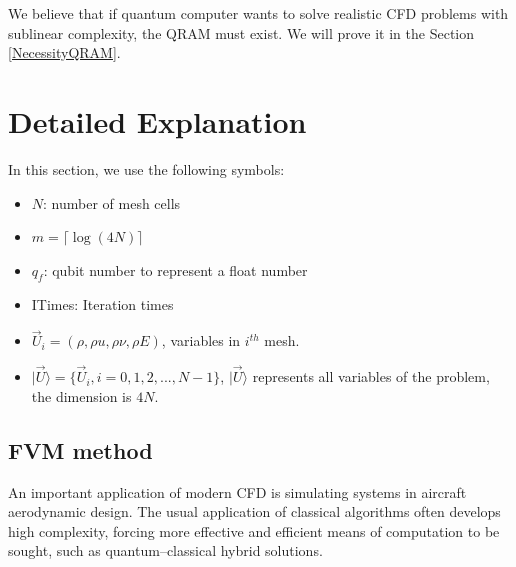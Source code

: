 \documentclass[%
 reprint,
 amsmath,amssymb,
pra,
]{revtex4-1}
\begin{document}
We believe that if quantum computer wants to solve realistic CFD problems with sublinear complexity, the QRAM must exist. We will prove it in the Section \ref{NecessityQRAM}.

\section{Detailed Explanation}\label{detail}
In this section, we use the following symbols:

\begin{itemize}
\item $N$: number of mesh cells
\item $m=\lceil \log(4N) \rceil$
\item $q_f$: qubit number to represent a float number
\item ITimes: Iteration times
\item $\vec{U}_i=(\rho,\rho u, \rho\nu, \rho E)$, variables in $i^{th}$ mesh.
\item $|\vec{U}\rangle=\{\vec{U}_i, i=0,1,2,...,N-1\}$, $|\vec{U}\rangle$ represents all variables of the problem, the dimension is $4N$.
\end{itemize}

\subsection{FVM method}\label{classicalFVM}

An important application of modern CFD is simulating systems in aircraft aerodynamic design. The usual application of classical algorithms often develops high complexity, forcing more effective and efficient means of computation to be sought, such as quantum--classical hybrid solutions.
\end{document}
